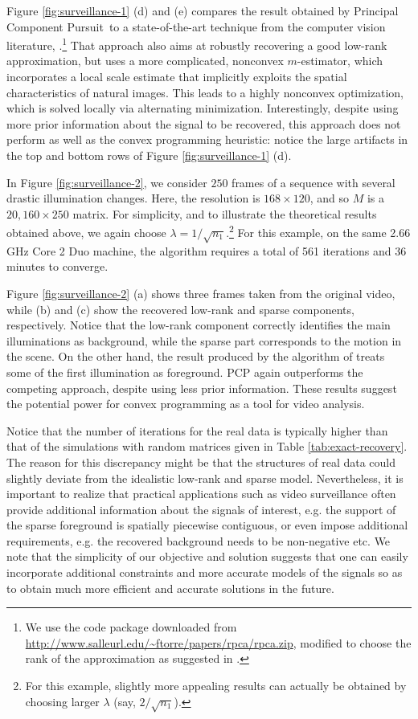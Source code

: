 Figure \ref{fig:surveillance-1} (d) and (e) compares the result obtained by Principal Component Pursuit\, to a state-of-the-art technique from the computer vision literature, \cite{DeLaTorre2003-IJCV}.\footnote{We
  use the code package downloaded from
  \url{http://www.salleurl.edu/~ftorre/papers/rpca/rpca.zip}, modified to choose the rank of the approximation as suggested in \cite{DeLaTorre2003-IJCV}.} That approach also aims at robustly recovering a good low-rank approximation, but uses a more complicated, nonconvex $m$-estimator, which incorporates a local scale estimate that implicitly exploits the spatial characteristics of natural images. This leads to a highly nonconvex optimization, which is solved locally via alternating minimization. Interestingly, despite using more prior information about the signal to be recovered, this approach does not perform as well as the convex programming heuristic: notice the large artifacts in the top and bottom rows of Figure
\ref{fig:surveillance-1} (d).

In Figure \ref{fig:surveillance-2}, we consider $250$ frames of a sequence with several drastic illumination changes. Here, the resolution is $168 \times 120$, and so $M$ is a $20,160 \times 250$ matrix. For simplicity, and to illustrate the theoretical results obtained above, we again choose $\lambda = 1/\sqrt{n_1}$.\footnote{For
  this example, slightly more appealing results can actually be obtained by choosing larger $\lambda$ (say, $2 / \sqrt{n_1}$).} For this example, on the same 2.66 GHz Core 2 Duo machine, the algorithm requires a total of 561 iterations and 36 minutes to converge.

Figure \ref{fig:surveillance-2} (a) shows three frames taken from the original video, while (b) and (c) show the recovered low-rank and sparse components, respectively. Notice that the low-rank component correctly identifies the main illuminations as background, while the sparse part corresponds to the motion in the scene. On the other hand, the result produced by the algorithm of \cite{DeLaTorre2003-IJCV} treats some of the first illumination as foreground. PCP again outperforms the competing approach, despite using less prior information. These results suggest the potential power for convex programming as a tool for video analysis.

Notice that the number of iterations for the real data is typically higher than that of the simulations with random matrices given in Table \ref{tab:exact-recovery}. The reason for this discrepancy might be that the structures of real data could slightly deviate from the idealistic low-rank and sparse model. Nevertheless, it is important to realize that practical applications such as video surveillance often provide additional information about the signals of interest, e.g. the support of the sparse foreground is spatially piecewise contiguous, or even impose additional requirements, e.g. the recovered background needs to be non-negative etc. We note that the simplicity of our objective and solution suggests that one can easily incorporate additional constraints and more accurate models of the signals so as to obtain much more efficient and accurate solutions in the future.


